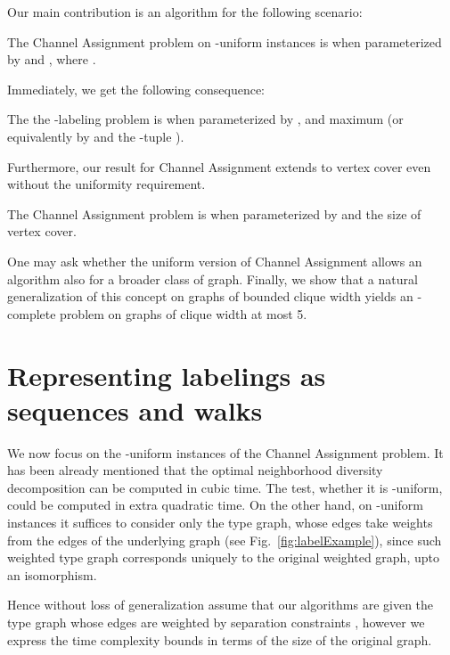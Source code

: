 \documentclass[a4paper,UKenglish]{lipics}
\newcommand{\NP}{{\sf{NP}}\xspace}
\newcommand{\FPT}{{\sf{FPT}}\xspace}
\theoremstyle{plain}
\theoremstyle{definition}
\begin{document}
{Our main contribution is an algorithm for the following scenario:

\begin{theorem}\label{thm:cha}
The {\sc Channel Assignment} problem on -uniform instances is \FPT{} when parameterized by  and , where .
\end{theorem}

Immediately, we get the following consequence:

\begin{theorem}\label{thm:Lp}
The  the {\sc -labeling} problem is \FPT{} when parameterized by ,  and maximum  (or equivalently by  and the -tuple ).
\end{theorem}

Furthermore, our \FPT{} result for {\sc Channel Assignment} extends to vertex cover even without the uniformity requirement.

\begin{theorem}\label{thm:chaVC}
The {\sc Channel Assignment} problem is \FPT{} when parameterized by  and the size of vertex cover.
\end{theorem}

One may ask whether the uniform version of {\sc Channel Assignment} allows an \FPT{} algorithm also for a broader class of graph.
Finally, we show that a natural generalization of this concept on graphs of bounded clique width yields an \NP-complete 
problem on graphs of clique width at most 5.
 \section{Representing labelings as sequences and walks}

We now focus on the -uniform instances of the {\sc Channel Assignment} problem.
It has been already mentioned that the optimal neighborhood diversity decomposition can be computed in cubic time. 
The test, whether it is -uniform, could be computed in extra quadratic time. 
On the other hand, on -uniform instances it suffices to consider only the type graph, whose edges take weights from the edges of the underlying graph (see Fig.~\ref{fig:labelExample}), since such weighted type graph corresponds 
uniquely to the original weighted graph, upto an isomorphism.

Hence without loss of generalization 
assume that our algorithms are given the type graph whose edges are weighted by separation constraints ,
however we express the time complexity bounds in terms of the size of the original graph.

}
\end{document}
